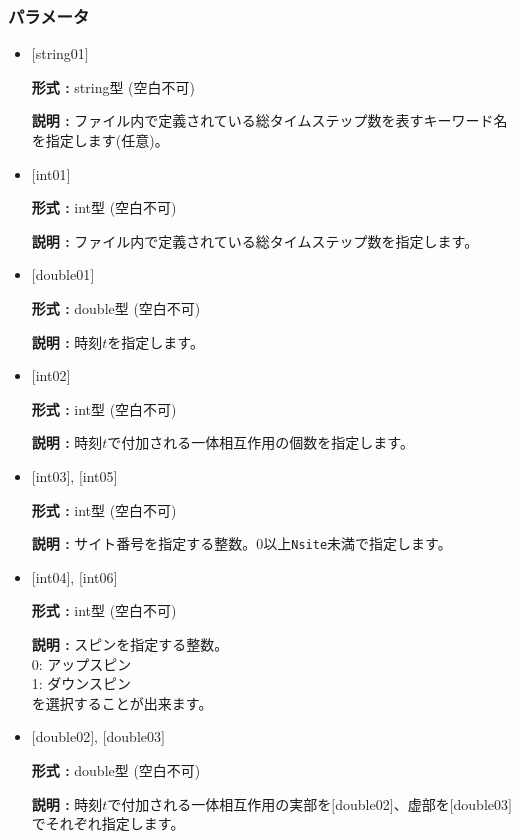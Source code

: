 \subsubsection{パラメータ}
 \begin{itemize}

   \item  $[$string01$]$
   
    {\bf 形式 :} string型 (空白不可)

   {\bf 説明 :} ファイル内で定義されている総タイムステップ数を表すキーワード名を指定します(任意)。

   \item  $[$int01$]$
   
    {\bf 形式 :} int型 (空白不可)

   {\bf 説明 :} ファイル内で定義されている総タイムステップ数を指定します。

\item  $[$double01$]$

 {\bf 形式 :} double型 (空白不可)

{\bf 説明 :}  時刻$t$を指定します。

 \item  $[$int02$]$

 {\bf 形式 :} int型 (空白不可)

{\bf 説明 :} 時刻$t$で付加される一体相互作用の個数を指定します。
 

  \item  $[$int03$]$, $[$int05$]$

 {\bf 形式 :} int型 (空白不可)

{\bf 説明 :} サイト番号を指定する整数。0以上\verb|Nsite|{未満}で指定します。
 
  \item  $[$int04$]$, $[$int06$]$

 {\bf 形式 :} int型 (空白不可)

{\bf 説明 :} スピンを指定する整数。\\
0: アップスピン\\
1: ダウンスピン\\
を選択することが出来ます。

\item  $[$double02$]$, $[$double03$]$

 {\bf 形式 :} double型 (空白不可)

{\bf 説明 :} 時刻$t$で付加される一体相互作用の実部を$[$double02$]$、虚部を$[$double03$]$でそれぞれ指定します。

\end{itemize}

